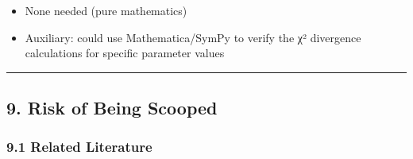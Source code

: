\documentclass[
  12pt,
]{ctexart}
\providecommand{\tightlist}{%
  \setlength{\itemsep}{0pt}\setlength{\parskip}{0pt}}
\begin{document}
\begin{itemize}
\tightlist
\item
  None needed (pure mathematics)
\item
  Auxiliary: could use Mathematica/SymPy to verify the χ² divergence
  calculations for specific parameter values
\end{itemize}

\begin{center}\rule{0.5\linewidth}{0.5pt}\end{center}

\subsection{9. Risk of Being Scooped}\label{risk-of-being-scooped}

\subsubsection{9.1 Related Literature}\label{related-literature}
\end{document}

